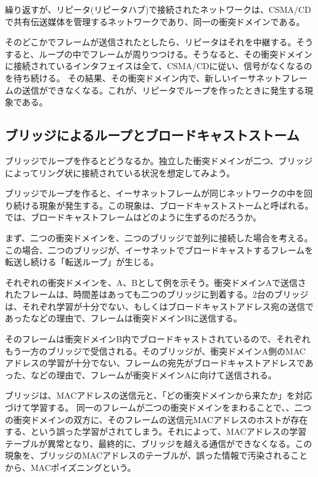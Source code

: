 繰り返すが、リピータ(リピータハブ)で接続されたネットワークは、CSMA/CDで共有伝送媒体を管理するネットワークであり、同一の衝突ドメインである。

そのどこかでフレームが送信されたとしたら、リピータはそれを中継する。そうすると、ループの中でフレームが周りつつける。そうなると、その衝突ドメインに接続されているインタフェイスは全て、CSMA/CDに従い、信号がなくなるのを待ち続ける。
その結果、その衝突ドメイン内で、新しいイーサネットフレームの送信ができなくなる。これが、リピータでループを作ったときに発生する現象である。

\subsection{ブリッジによるループとブロードキャストストーム}

ブリッジでループを作るとどうなるか。独立した衝突ドメインが二つ、ブリッジによってリング状に接続されている状況を想定してみよう。

ブリッジでループを作ると、イーサネットフレームが同じネットワークの中を回り続ける現象が発生する。この現象は、ブロードキャストストームと呼ばれる。では、ブロードキャストフレームはどのように生ずるのだろうか。

まず、二つの衝突ドメインを、二つのブリッジで並列に接続した場合を考える。この場合、二つのブリッジが、イーサネットでブロードキャストするフレームを転送し続ける「転送ループ」が生じる。

それぞれの衝突ドメインを、A、Bとして例を示そう。衝突ドメインAで送信されたフレームは、時間差はあっても二つのブリッジに到着する。2台のブリッジは、それぞれ学習が十分でない、もしくはブロードキャストアドレス宛の送信であったなどの理由で、フレームは衝突ドメインBに送信する。

そのフレームは衝突ドメインB内でブロードキャストされているので、それぞれもう一方のブリッジで受信される。そのブリッジが、衝突ドメインA側のMACアドレスの学習が十分でない、フレームの宛先がブロードキャストアドレスであった、などの理由で、フレームが衝突ドメインAに向けて送信される。

ブリッジは、MACアドレスの送信元と、「どの衝突ドメインから来たか」を対応づけて学習する。
同一のフレームが二つの衝突ドメインをまわることで、、二つの衝突ドメインの双方に、そのフレームの送信元MACアドレスのホストが存在する、という誤った学習がされてしまう。それによって、MACアドレスの学習テーブルが異常となり、最終的に、ブリッジを越える通信ができなくなる。この現象を、ブリッジのMACアドレスのテーブルが、誤った情報で汚染されることから、MACポイズニングという。

